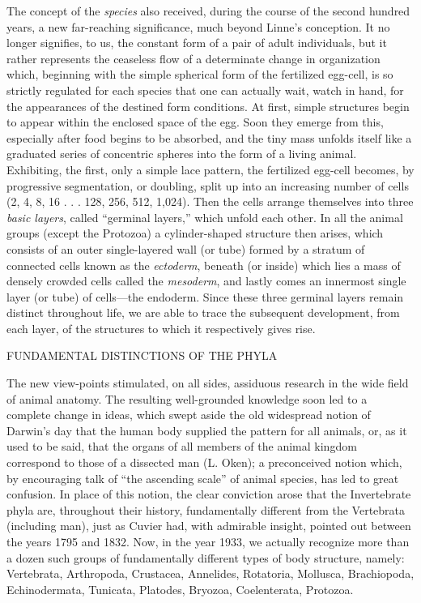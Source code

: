 The concept of the \textit{species} also received, during the course of the second hundred years, a
new far-reaching significance, much beyond Linne's conception. It no longer signifies, to us,
the constant form of a pair of adult individuals, but it rather represents the ceaseless flow of a
determinate change in organization which, beginning with the simple spherical form of the
fertilized egg-cell, is so strictly regulated for each species that one can actually wait, watch in
hand, for the appearances of the destined form conditions. At first, simple structures begin to
appear within the enclosed space of the egg. Soon they emerge from this, especially after
food begins to be absorbed, and the tiny mass unfolds itself like a graduated series of
concentric spheres into the form of a living animal. Exhibiting, the first, only a simple lace
pattern, the fertilized egg-cell becomes, by progressive segmentation, or doubling, split up
into an increasing number of cells (2, 4, 8, 16 . . . 128, 256, 512, 1,024). Then the cells
arrange themselves into three \textit{basic layers}, called ``germinal layers,'' which unfold each other.
In all the animal groups (except the Protozoa) a cylinder-shaped structure then arises, which
consists of an outer single-layered wall (or tube) formed by a stratum of connected cells
known as the \textit{ectoderm}, beneath (or inside) which lies a mass of densely crowded cells called
the \textit{mesoderm}, and lastly comes an innermost single layer (or tube) of cells—the endoderm.
Since these three germinal layers remain distinct throughout life, we are able to trace the
subsequent development, from each layer, of the structures to which it respectively gives rise.

FUNDAMENTAL DISTINCTIONS OF THE PHYLA

The new view-points stimulated, on all sides, assiduous research in the wide field of animal
anatomy. The resulting well-grounded knowledge soon led to a complete change in ideas,
which swept aside the old widespread notion of Darwin's day that the human body supplied
the pattern for all animals, or, as it used to be said, that the organs of all members of the
animal kingdom correspond to those of a dissected man (L. Oken); a preconceived notion
which, by encouraging talk of ``the ascending scale'' of animal species, has led to great
confusion. In place of this notion, the clear conviction arose that the Invertebrate phyla are,
throughout their history, fundamentally different from the Vertebrata (including man), just as
Cuvier had, with admirable insight, pointed out between the years 1795 and 1832. Now, in
the year 1933, we actually recognize more than a dozen such groups of fundamentally
different types of body structure, namely: Vertebrata, Arthropoda, Crustacea, Annelides,
Rotatoria, Mollusca, Brachiopoda, Echinodermata, Tunicata, Platodes, Bryozoa,
Coelenterata, Protozoa.

